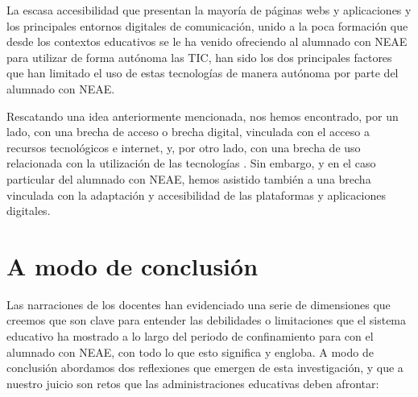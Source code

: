 \documentclass{textolivre}
\begin{document}
La escasa accesibilidad que presentan la mayoría de páginas webs y aplicaciones \cite{renilla2010} %
y los principales entornos digitales de comunicación, unido a la poca formación que desde los contextos educativos se le ha venido ofreciendo al alumnado con NEAE para utilizar de forma autónoma las TIC, han sido los dos principales factores que han limitado el uso de estas tecnologías de manera autónoma por parte del alumnado con NEAE.

Rescatando una idea anteriormente mencionada, nos hemos encontrado, por un lado, con una brecha de acceso o brecha digital, vinculada con el acceso a recursos tecnológicos e internet, y, por otro lado, con una brecha de uso relacionada con la utilización de las tecnologías \cite{rogero2020}. %
Sin embargo, y en el caso particular del alumnado con NEAE, hemos asistido también a una brecha vinculada con la adaptación y accesibilidad de las plataformas y aplicaciones digitales. 

\section{A modo de conclusión}
Las narraciones de los docentes han evidenciado una serie de dimensiones que creemos que son clave para entender las debilidades o limitaciones que el sistema educativo ha mostrado a lo largo del periodo de confinamiento para con el alumnado con NEAE, con todo lo que esto significa y engloba. A modo de conclusión abordamos dos reflexiones que emergen de esta investigación, y que a nuestro juicio son retos que las administraciones educativas deben afrontar:
\end{document}
